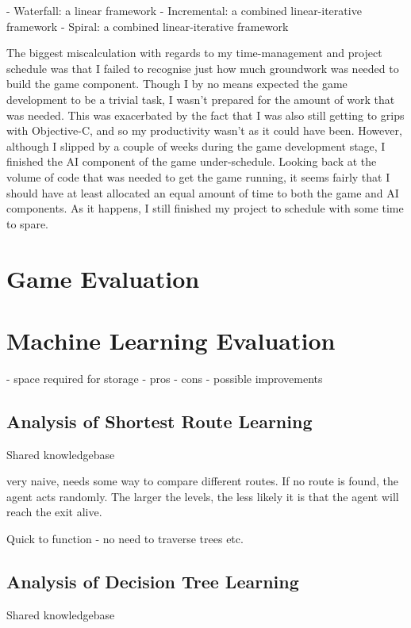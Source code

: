 \documentclass[a4paper,oneside]{report}
\begin{document}
- Waterfall: a linear framework
- Incremental: a combined linear-iterative framework
- Spiral: a combined linear-iterative framework
		
The biggest miscalculation with regards to my time-management and project schedule was that I failed to recognise just how much groundwork was needed to build the game component. Though I by no means expected the game development to be a trivial task, I wasn't prepared for the amount of work that was needed. This was exacerbated by the fact that I was also still getting to grips with Objective-C, and so my productivity wasn't as it could have been. However, although I slipped by a couple of weeks during the game development stage, I finished the AI component of the game under-schedule. Looking back at the volume of code that was needed to get the game running, it seems fairly that I should have at least allocated an equal amount of time to both the game and AI components. As it happens, I still finished my project to schedule with some time to spare.

\section{Game Evaluation}

\section{Machine Learning Evaluation}

- space required for storage
- pros
- cons
- possible improvements

\subsection{Analysis of Shortest Route Learning}

Shared knowledgebase

very naive, needs some way to compare different routes. If no route is found, the agent acts randomly. The larger the levels, the less likely it is that the agent will reach the exit alive.

Quick to function - no need to traverse trees etc.

\subsection{Analysis of Decision Tree Learning}

Shared knowledgebase
\end{document}
